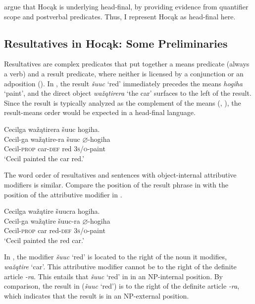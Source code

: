 \documentclass[output=paper]{LSP/langsci}
\begin{document}
\citet{JohnsonRosen2014} argue that Hocąk is underlying head-final, by providing evidence from quantifier scope and postverbal predicates. Thus, I represent Hocąk as head-final here.

\subsection{Resultatives in Hocąk: Some Preliminaries}

Resultatives are complex predicates that put together a means predicate (always a verb) and a result predicate, where neither is licensed by a conjunction or an adposition (\citealt{Williams2008}). In , the result \textit{šuuc} `red' immediately precedes the means \textit{hogiha} `paint', and the direct object \textit{wažątirera} `the car' surfaces to the left of the result. Since the result is typically analyzed as the complement of the means (\citealt{Li1999}, \citealt{Williams2008}), the result-means order would be expected in a head-final language.

\begin{exe}

\ex \glll Cecilga wažątirera šuuc hogiha. \\
Cecil-ga  wažątire-ra šuuc {$\varnothing$}-hogiha \\
Cecil-\textsc{prop} car-\textsc{def} red \textsc{3s/o}-paint\\
\glt `Cecil painted the car red.'

\end{exe}

The word order of resultatives and sentences with object-internal attributive modifiers is similar. Compare the position of the result phrase in  with the position of the attributive modifier in .

\begin{exe}

\ex \glll Cecilga wažątire šuucra hogiha. \\
Cecil-ga  wažątire šuuc-ra  {$\varnothing$}-hogiha\\
Cecil-\textsc{prop} car red-\textsc{def}  \textsc{3s/o}-paint\\
\glt `Cecil painted the red car.'

\end{exe}

In , the modifier \textit{šuuc} `red' is located to the right of the noun it modifies, \textit{wažątire} `car'. This attributive modifier cannot be to the right of the definite article \textit{-ra}. This entails that \textit{šuuc} `red' in  in an NP-internal position. By comparison, the result in  (\textit{šuuc} `red') is to the right of the definite article \textit{-ra}, which indicates that the result is in an NP-external position.
\end{document}
